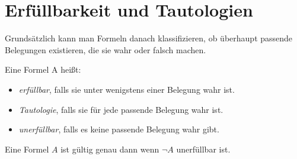 \section{Erfüllbarkeit und Tautologien}
Grundsätzlich kann man Formeln danach klassifizieren, ob überhaupt passende Belegungen
existieren, die sie wahr oder falsch machen.
\begin{defi} \label{Definition 2.38} \end{defi} 
Eine Formel A heißt: 
\begin{itemize}																					
\item \textit{erfüllbar}, falls sie unter wenigstens einer Belegung wahr ist.
\item \textit{Tautologie}, falls sie für jede passende Belegung wahr ist.
\item \textit{unerfüllbar}, falls es keine passende Belegung wahr gibt.
\end{itemize}
\begin{sa} \label{Satz 2.39} \end{sa}
Eine Formel $A$ ist gültig genau dann wenn $\neg A$ unerfüllbar ist.